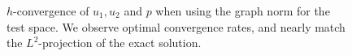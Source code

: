 \begin{figure}[h!b!p!]
{\label{fig:pressuregraph_h}
}
\caption{$h$-convergence of $u_{1},u_{2}$ and $p$ when using the graph norm for the test space.  We observe optimal convergence rates, and nearly match the $L^{2}$-projection of the exact solution.
}
\label{fig:graph_h}
\end{figure}

\begin{figure}[h!b!p!]
\centering
{}
\subfigure[$p$]{
}
\end{figure}
